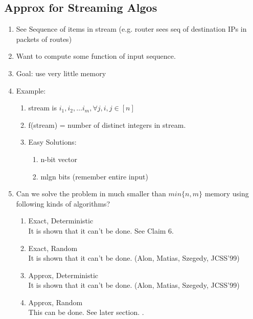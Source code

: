 \documentclass[11pt]{article}
\newcommand{\<}{\langle}
\renewcommand{\>}{\rangle}
\theoremstyle{definition}
\numberwithin{problem}{section}
\begin{document}
\subsection{Approx for Streaming Algos}
\begin{enumerate}
	\item See Sequence of items in stream (e.g. router sees seq of destination IPs in packets of routes)
    \item Want to compute some function of input sequence.
    \item Goal: use very little memory
    \item Example:
    	\begin{enumerate}
        	\item stream is $i_1, i_2, \ldots i_m, \forall j, i,j \in [n]$
            \item f(stream) = number of distinct integers in stream.
            \item Easy Solutions:
            	\begin{enumerate}
                	\item n-bit vector
                    \item mlgn bits (remember entire input)
                \end{enumerate}
        \end{enumerate}
     \item Can we solve the problem in much smaller than $min\{n,m\}$ memory using following kinds of algorithms?
     	\begin{enumerate}
        	\item Exact, Deterministic \\
            	It is shown that it can't be done. See Claim 6.
           \item Exact, Random\\
            	It is shown that it can't be done. (Alon, Matias, Szegedy, JCSS'99)
            \item Approx, Deterministic\\
            	It is shown that it can't be done. (Alon, Matias, Szegedy, JCSS'99)
            \item Approx, Random\\
            	This can be done. See later section. \cite{fm}. 
        \end{enumerate}
\end{enumerate}
\end{document}
